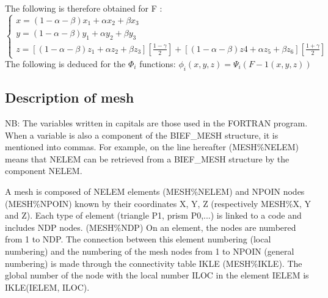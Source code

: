The following is therefore obtained for F :
\[\left\{\begin{array}{c} {x=(1-\alpha -\beta )x_{1} +\alpha x_{2} +\beta x_{3}
  } \\ {y=(1-\alpha -\beta )y_{1} +\alpha y_{2} +\beta y_{3} } \\
  {z=\left[(1-\alpha -\beta )z_{1} +\alpha z_{2} +\beta z_{3}
  \right]\left[\frac{1-\gamma }{2} \right]+\left[(1-\alpha -\beta )z4+\alpha
  z_{5} +\beta z_{6} \right]\left[\frac{1+\gamma }{2} \right]}
  \end{array}\right. \]
  The following is deduced for the $\Phi _{i}$ functions:
  $\phi _{i} (x, y, z) =  \Psi _{i} (F-1 (x, y, z))$

\subsection{Description of mesh}

NB: The variables written in capitals are those used in the \bief FORTRAN
program. When a variable is also a component of the BIEF\_MESH structure, it is
mentioned into commas. For example, on the line hereafter (MESH\%NELEM) means
that NELEM can be retrieved from a BIEF\_MESH structure by the component
NELEM.

A mesh is composed of NELEM elements (MESH\%NELEM) and NPOIN nodes
(MESH\%NPOIN) known by their coordinates X, Y, Z (respectively MESH\%X, Y and
Z). Each type of element (triangle P1, prism P0,...) is linked to a code and
includes NDP nodes. (MESH\%NDP) On an element, the nodes are numbered from 1 to
NDP. The connection between this element numbering (local numbering) and the
numbering of the mesh nodes from 1 to NPOIN (general numbering) is made through
the connectivity table IKLE (MESH\%IKLE). The global number of the node with
the local number ILOC in the element IELEM is IKLE(IELEM, ILOC).

